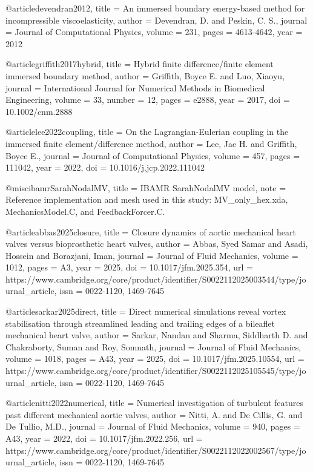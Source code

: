 @article{devendran2012,
  title = {An immersed boundary energy-based method for incompressible viscoelasticity},
  author = {Devendran, D. and Peskin, C. S.},
  journal = {Journal of Computational Physics},
  volume = {231},
  pages = {4613-4642},
  year = {2012}
}

@article{griffith2017hybrid,
  title = {Hybrid finite difference/finite element immersed boundary method},
  author = {Griffith, Boyce E. and Luo, Xiaoyu},
  journal = {International Journal for Numerical Methods in Biomedical Engineering},
  volume = {33},
  number = {12},
  pages = {e2888},
  year = {2017},
  doi = {10.1002/cnm.2888}
}

@article{lee2022coupling,
  title = {On the Lagrangian-Eulerian coupling in the immersed finite element/difference method},
  author = {Lee, Jae H. and Griffith, Boyce E.},
  journal = {Journal of Computational Physics},
  volume = {457},
  pages = {111042},
  year = {2022},
  doi = {10.1016/j.jcp.2022.111042}
}

@misc{ibamrSarahNodalMV,
  title = {IBAMR SarahNodalMV model},
  note = {Reference implementation and mesh used in this study: MV_only_hex.xda, MechanicsModel.C, and FeedbackForcer.C.}
}

@article{abbas2025closure,
  title = {Closure dynamics of aortic mechanical heart valves versus bioprosthetic heart valves},
  author = {Abbas, Syed Samar and Asadi, Hossein and Borazjani, Iman},
  journal = {Journal of Fluid Mechanics},
  volume = {1012},
  pages = {A3},
  year = {2025},
  doi = {10.1017/jfm.2025.354},
  url = {https://www.cambridge.org/core/product/identifier/S0022112025003544/type/journal_article},
  issn = {0022-1120, 1469-7645}
}

@article{sarkar2025direct,
  title = {Direct numerical simulations reveal vortex stabilisation through streamlined leading and trailing edges of a bileaflet mechanical heart valve},
  author = {Sarkar, Nandan and Sharma, Siddharth D. and Chakraborty, Suman and Roy, Somnath},
  journal = {Journal of Fluid Mechanics},
  volume = {1018},
  pages = {A43},
  year = {2025},
  doi = {10.1017/jfm.2025.10554},
  url = {https://www.cambridge.org/core/product/identifier/S0022112025105545/type/journal_article},
  issn = {0022-1120, 1469-7645}
}

@article{nitti2022numerical,
  title = {Numerical investigation of turbulent features past different mechanical aortic valves},
  author = {Nitti, A. and De Cillis, G. and De Tullio, M.D.},
  journal = {Journal of Fluid Mechanics},
  volume = {940},
  pages = {A43},
  year = {2022},
  doi = {10.1017/jfm.2022.256},
  url = {https://www.cambridge.org/core/product/identifier/S0022112022002567/type/journal_article},
  issn = {0022-1120, 1469-7645}
}

